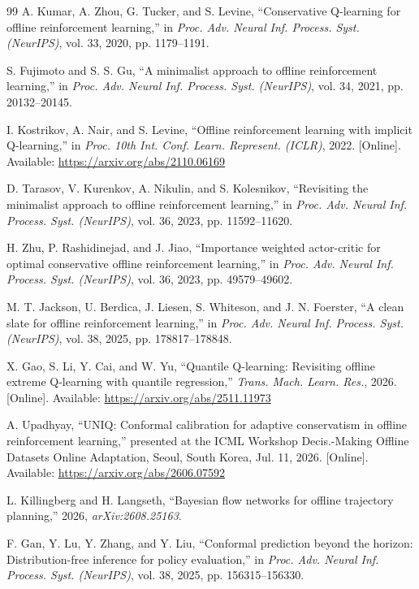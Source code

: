 \documentclass[journal]{IEEEtran}
\begin{document}
\begin{thebibliography}{99}
A. Kumar, A. Zhou, G. Tucker, and S. Levine, ``Conservative Q-learning for offline reinforcement learning,'' in \emph{Proc. Adv. Neural Inf. Process. Syst. (NeurIPS)}, vol. 33, 2020, pp. 1179--1191.

S. Fujimoto and S. S. Gu, ``A minimalist approach to offline reinforcement learning,'' in \emph{Proc. Adv. Neural Inf. Process. Syst. (NeurIPS)}, vol. 34, 2021, pp. 20132--20145.

I. Kostrikov, A. Nair, and S. Levine, ``Offline reinforcement learning with implicit Q-learning,'' in \emph{Proc. 10th Int. Conf. Learn. Represent. (ICLR)}, 2022. [Online]. Available: \url{https://arxiv.org/abs/2110.06169}

D. Tarasov, V. Kurenkov, A. Nikulin, and S. Kolesnikov, ``Revisiting the minimalist approach to offline reinforcement learning,'' in \emph{Proc. Adv. Neural Inf. Process. Syst. (NeurIPS)}, vol. 36, 2023, pp. 11592--11620.

H. Zhu, P. Rashidinejad, and J. Jiao, ``Importance weighted actor-critic for optimal conservative offline reinforcement learning,'' in \emph{Proc. Adv. Neural Inf. Process. Syst. (NeurIPS)}, vol. 36, 2023, pp. 49579--49602.

M. T. Jackson, U. Berdica, J. Liesen, S. Whiteson, and J. N. Foerster, ``A clean slate for offline reinforcement learning,'' in \emph{Proc. Adv. Neural Inf. Process. Syst. (NeurIPS)}, vol. 38, 2025, pp. 178817--178848.

X. Gao, S. Li, Y. Cai, and W. Yu, ``Quantile Q-learning: Revisiting offline extreme Q-learning with quantile regression,'' \emph{Trans. Mach. Learn. Res.}, 2026. [Online]. Available: \url{https://arxiv.org/abs/2511.11973}

A. Upadhyay, ``UNIQ: Conformal calibration for adaptive conservatism in offline reinforcement learning,'' presented at the ICML Workshop Decis.-Making Offline Datasets Online Adaptation, Seoul, South Korea, Jul. 11, 2026. [Online]. Available: \url{https://arxiv.org/abs/2606.07592}

L. Killingberg and H. Langseth, ``Bayesian flow networks for offline trajectory planning,'' 2026, \emph{arXiv:2608.25163}.

F. Gan, Y. Lu, Y. Zhang, and Y. Liu, ``Conformal prediction beyond the horizon: Distribution-free inference for policy evaluation,'' in \emph{Proc. Adv. Neural Inf. Process. Syst. (NeurIPS)}, vol. 38, 2025, pp. 156315--156330.


\end{thebibliography}
\end{document}
